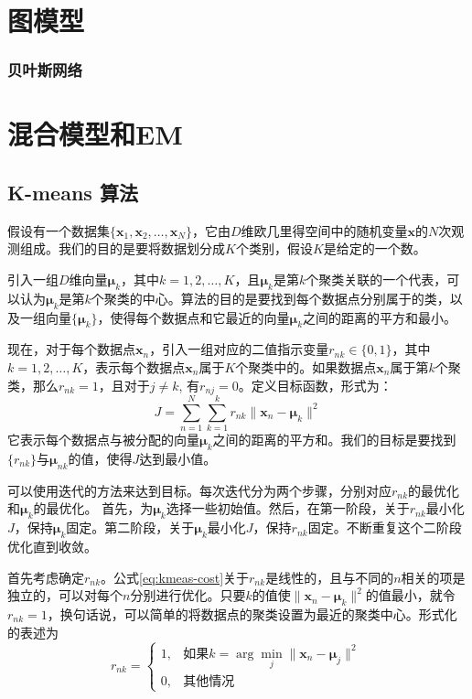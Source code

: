 \documentclass[11pt]{ctexbook}
\begin{document}
\chapter{图模型}
\subsection{贝叶斯网络}

\chapter{混合模型和EM}
\section{K-means 算法}
假设有一个数据集$\{ \bm x_1, \bm x_2, \ldots, \bm x_N\}$，它由$D$维欧几里得空间中的随机变量$\bm x$的$N$次观测组成。我们的目的是要将数据划分成$K$个类别，假设$K$是给定的一个数。

引入一组$D$维向量$\bm \mu_k$，其中$k=1, 2, \ldots, K$，且$\bm \mu_k$是第$k$个聚类关联的一个代表，可以认为$\bm \mu_k$是第$k$个聚类的中心。算法的目的是要找到每个数据点分别属于的类，以及一组向量$\{\bm \mu_k\}$，使得每个数据点和它最近的向量$\bm \mu_k$之间的距离的平方和最小。

现在，对于每个数据点$\bm x_n$，引入一组对应的二值指示变量$r_{nk} \in \{0, 1\}$，其中 $k = 1, 2, \ldots, K$，表示每个数据点$\bm x_n$属于$K$个聚类中的。如果数据点$\bm x_n$属于第$k$个聚类，那么$r_{nk}=1$，且对于$j \neq k$, 有$r_{nj} = 0$。定义目标函数，形式为：
\begin{equation}
	\label{eq:kmeas-cost}
	J = \sum_{n=1}^{N}\sum_{k=1}^{k}r_{nk}\| \bm x_n - \bm \mu_k \|^2
\end{equation}
它表示每个数据点与被分配的向量$\bm \mu_k$之间的距离的平方和。我们的目标是要找到$\{r_{nk}\}$与$\bm \mu_{nk}$的值，使得$J$达到最小值。

可以使用迭代的方法来达到目标。每次迭代分为两个步骤，分别对应$r_{nk}$的最优化和$\bm \mu_k$的最优化。 首先，为$\bm \mu_k$选择一些初始值。然后，在第一阶段，关于$r_{nk}$最小化$J$，保持$\bm \mu_k$固定。第二阶段，关于$\bm \mu_k$最小化$J$，保持$r_{nk}$固定。不断重复这个二阶段优化直到收敛。

首先考虑确定$r_{nk}$。公式\ref{eq:kmeas-cost}关于$r_{nk}$是线性的，且与不同的$n$相关的项是独立的，可以对每个$n$分别进行优化。只要$k$的值使$\|\bm x_n-\bm \mu_k\|^2$的值最小，就令$r_{nk}=1$，换句话说，可以简单的将数据点的聚类设置为最近的聚类中心。形式化的表述为
\begin{equation}
	r_{nk} = \left\{\begin{array}{ll}
		1, & \text{如果} k = \arg\min_{j} \| \bm x_n - \bm \mu_j\|^2 \\
		0, & \text{其他情况}
	\end{array}\right.
\end{equation}
\end{document}
